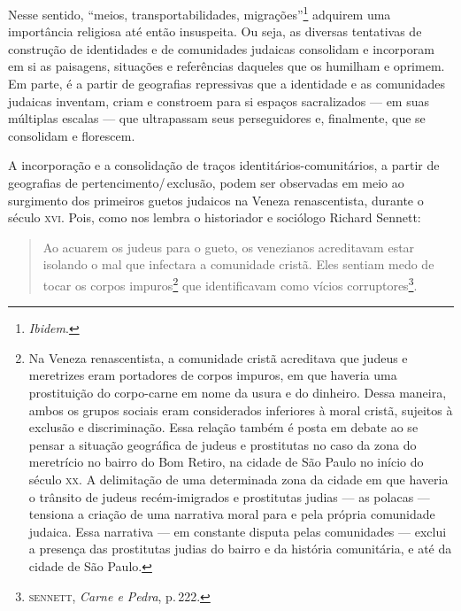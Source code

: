 Nesse sentido, ``meios, transportabilidades, migrações''\footnote{\emph{Ibidem}.}
adquirem uma importância religiosa até então insuspeita. Ou seja, as
diversas tentativas de construção de identidades e de comunidades
judaicas consolidam e incorporam em si as paisagens, situações e
referências daqueles que os humilham e oprimem. Em parte, é a partir de
geografias repressivas que a identidade e as comunidades judaicas
inventam, criam e constroem para si espaços sacralizados --- em suas
múltiplas escalas --- que ultrapassam seus perseguidores e, finalmente,
que se consolidam e florescem.

\begin{center}\end{center}

\noindent{}A incorporação e a consolidação de traços identitários-comunitários, a
partir de geografias de pertencimento/\,exclusão, podem ser observadas em
meio ao surgimento dos primeiros guetos judaicos na Veneza
renascentista, durante o século \textsc{xvi}. Pois, como nos lembra o historiador
e sociólogo Richard Sennett:

\begin{quote}
Ao acuarem os judeus para o gueto, os venezianos acreditavam estar
isolando o mal que infectara a comunidade cristã. Eles sentiam medo de
tocar os corpos impuros\footnote{Na Veneza renascentista, a comunidade
  cristã acreditava que judeus e meretrizes eram portadores de corpos
  impuros, em que haveria uma prostituição do corpo-carne em nome da
  usura e do dinheiro. Dessa maneira, ambos os grupos sociais eram
  considerados inferiores à moral cristã, sujeitos à exclusão e
  discriminação. Essa relação também é posta em debate ao se pensar a situação
  geográfica de judeus e prostitutas no caso da zona do meretrício no
  bairro do Bom Retiro, na cidade de São Paulo no início do século \textsc{xx}. A
  delimitação de uma determinada zona da cidade em que haveria o
  trânsito de judeus recém-imigrados e prostitutas judias --- as polacas
  --- tensiona a criação de uma narrativa moral para e pela própria
  comunidade judaica. Essa narrativa --- em constante disputa pelas
  comunidades --- exclui a presença das prostitutas judias do bairro e
  da história comunitária, e até da cidade de São Paulo.} que
identificavam como vícios corruptores\footnote{\textsc{sennett}, \emph{Carne e
  Pedra}, p.\,222.}.
\end{quote}

